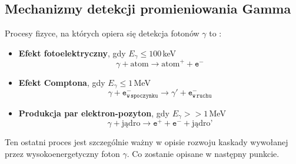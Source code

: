 \documentclass[a4paper,11pt,twoside]{article}
\begin{document}
\subsection{Mechanizmy detekcji promieniowania Gamma}
Procesy fizyce, na których opiera się detekcja fotonów $\gamma$ to \cite{astro_particle}:
\begin{itemize}
\item {\bf{Efekt fotoelektryczny}}, gdy $E_{\gamma} \leq 100$\,keV
\begin{equation}
\gamma + \text{atom} \rightarrow \text{atom}^+ + \mathtt{e^-}
\end{equation}
\item {\bf{Efekt Comptona}}, gdy $E_{\gamma} \leq 1$\,MeV
\begin{equation}
\gamma + \mathtt{e^{-}_{w\,spoczynku}} \rightarrow \gamma' + \mathtt{e^{-}_{w\,ruchu}}
\end{equation}
\item {\bf{Produkcja par elektron-pozyton}}, gdy $E_{\gamma} >> 1$\,MeV
\begin{equation}
\gamma + \text{jądro} \rightarrow \mathtt{e^+} + \mathtt{e^-} + \text{jądro'}
\end{equation}
\end{itemize}
Ten ostatni proces jest szczególnie ważny w opisie rozwoju kaskady wywołanej przez wysokoenergetyczny foton $\gamma$. Co zostanie opisane w następny punkcie.
\end{document}
